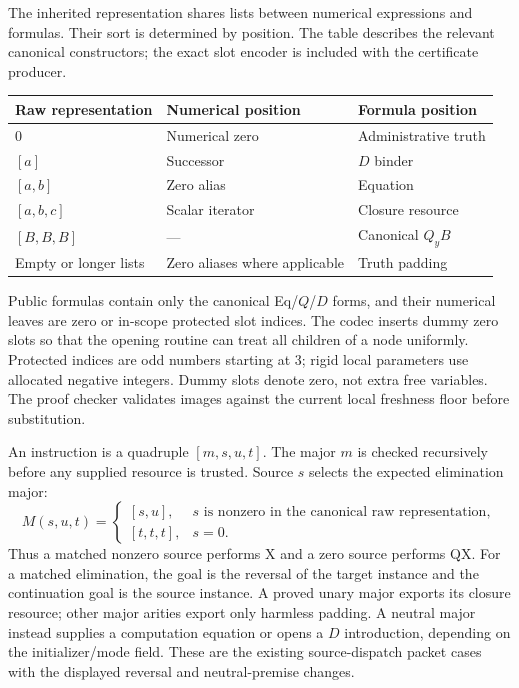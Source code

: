 \documentclass[11pt,letterpaper]{article}
\theoremstyle{definition}\newtheorem{definition}[theorem]{Definition}
\theoremstyle{remark}\newtheorem{remark}[theorem]{Remark}
\begin{document}
The inherited representation shares lists between numerical expressions
and formulas. Their sort is determined by position. The table describes
the relevant canonical constructors; the exact slot encoder is included
with the certificate producer.
\begin{center}\small
\begin{tabular}{@{}lll@{}}
\toprule
Raw representation & Numerical position & Formula position\\
\midrule
$0$ & Numerical zero & Administrative truth\\
$[a]$ & Successor & $D$ binder\\
$[a,b]$ & Zero alias & Equation\\
$[a,b,c]$ & Scalar iterator & Closure resource\\
$[B,B,B]$ & --- & Canonical $Q_yB$\\
Empty or longer lists & Zero aliases where applicable & Truth padding\\
\bottomrule
\end{tabular}
\end{center}

Public formulas contain only the canonical Eq/$Q$/$D$ forms, and their
numerical leaves are zero or in-scope protected slot indices. The codec
inserts dummy zero slots so that the opening routine can treat all
children of a node uniformly. Protected indices are odd numbers starting
at 3; rigid local parameters use allocated negative integers. Dummy slots
denote zero, not extra free variables. The proof checker validates images
against the current local freshness floor before substitution.

An instruction is a quadruple $[m,s,u,t]$. The major $m$ is checked
recursively before any supplied resource is trusted. Source $s$ selects
the expected elimination major:
\[
 M(s,u,t)=
 \begin{cases}
 [s,u],&s\text{ is nonzero in the canonical raw representation},\\
 [t,t,t],&s=0.
 \end{cases}
\]
Thus a matched nonzero source performs X and a zero source performs QX.
For a matched elimination, the goal is the reversal of the target
instance and the continuation goal is the source instance. A proved
unary major exports its closure resource; other major arities export
only harmless padding. A neutral major instead supplies a computation
equation or opens a $D$ introduction, depending on the initializer/mode
field. These are the existing source-dispatch packet cases with the
displayed reversal and neutral-premise changes.
\end{document}
